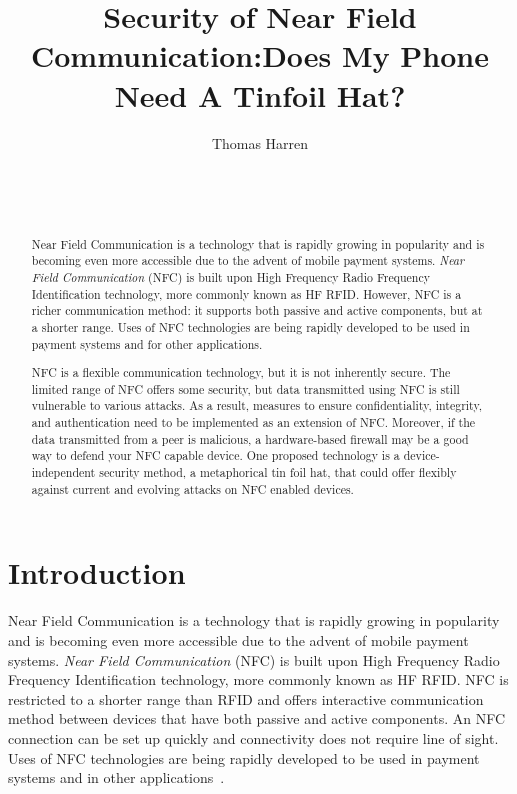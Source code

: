 \documentclass{sig-alternate}
\begin{document}

\title{Security of Near Field Communication:\break Does My Phone Need A Tinfoil Hat?}


\author{
\alignauthor
Thomas Harren\\
	\\
	\\
	\\
}

\maketitle
\begin{abstract}
Near Field Communication is a technology that is rapidly growing in popularity and is becoming even more accessible due to the advent of mobile payment systems. \textit{Near Field Communication} (NFC) is built upon High Frequency Radio Frequency Identification technology, more commonly known as HF RFID. However, NFC is a richer communication method: it supports both passive and active components, but at a shorter range. Uses of NFC technologies are being rapidly developed to be used in payment systems and for other applications.

NFC is a flexible communication technology, but it is not inherently secure. The limited range of NFC offers some security, but data transmitted using NFC is still vulnerable to various attacks. As a result, measures to ensure confidentiality, integrity, and authentication need to be implemented as an extension of NFC. Moreover, if the data transmitted from a peer is malicious, a hardware-based firewall may be a good way to defend your NFC capable device. One proposed technology is a device-independent security method, a metaphorical tin foil hat, that could offer flexibly against current and evolving attacks on NFC enabled devices.
\end{abstract}


\section{Introduction}
\label{sec:introduction}
Near Field Communication is a technology that is rapidly growing in popularity and is becoming even more accessible due to the advent of mobile payment systems. \textit{Near Field Communication} (NFC) is built upon High Frequency Radio Frequency Identification technology, more commonly known as HF RFID. NFC is restricted to a shorter range than RFID and offers interactive communication method between devices that have both passive and active components. An NFC connection can be set up quickly and connectivity does not require line of sight. Uses of NFC technologies are being rapidly developed to be used in payment systems and in other applications~\cite{Gum2013}.
\end{document}
